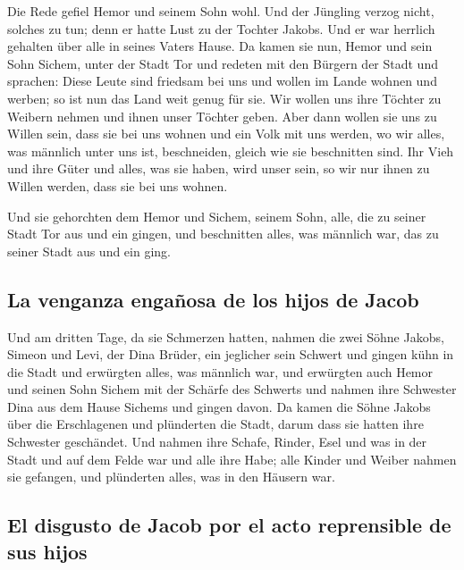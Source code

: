  Die Rede gefiel Hemor und seinem Sohn wohl.
 Und der Jüngling verzog nicht, solches zu tun; denn er
hatte Lust zu der Tochter Jakobs. Und er war herrlich gehalten über alle
in seines Vaters Hause.  Da kamen sie nun, Hemor und sein
Sohn Sichem, unter der Stadt Tor und redeten mit den Bürgern der Stadt
und sprachen:  Diese Leute sind friedsam bei uns und
wollen im Lande wohnen und werben; so ist nun das Land weit genug für
sie. Wir wollen uns ihre Töchter zu Weibern nehmen und ihnen unser
Töchter geben.  Aber dann wollen sie uns zu Willen sein,
dass sie bei uns wohnen und ein Volk mit uns werden, wo wir alles, was
männlich unter uns ist, beschneiden, gleich wie sie beschnitten sind.
 Ihr Vieh und ihre Güter und alles, was sie haben, wird
unser sein, so wir nur ihnen zu Willen werden, dass sie bei uns wohnen.

 Und sie gehorchten dem Hemor und Sichem, seinem Sohn,
alle, die zu seiner Stadt Tor aus und ein gingen, und beschnitten alles,
was männlich war, das zu seiner Stadt aus und ein ging.

\hypertarget{la-venganza-engauxf1osa-de-los-hijos-de-jacob}{%
\subsection{La venganza engañosa de los hijos de
Jacob}\label{la-venganza-engauxf1osa-de-los-hijos-de-jacob}}

 Und am dritten Tage, da sie Schmerzen hatten, nahmen die
zwei Söhne Jakobs, Simeon und Levi, der Dina Brüder, ein jeglicher sein
Schwert und gingen kühn in die Stadt und erwürgten alles, was männlich
war,  und erwürgten auch Hemor und seinen Sohn Sichem mit
der Schärfe des Schwerts und nahmen ihre Schwester Dina aus dem Hause
Sichems und gingen davon.  Da kamen die Söhne Jakobs über
die Erschlagenen und plünderten die Stadt, darum dass sie hatten ihre
Schwester geschändet.  Und nahmen ihre Schafe, Rinder,
Esel und was in der Stadt und auf dem Felde war  und alle
ihre Habe; alle Kinder und Weiber nahmen sie gefangen, und plünderten
alles, was in den Häusern war.

\hypertarget{el-disgusto-de-jacob-por-el-acto-reprensible-de-sus-hijos}{%
\subsection{El disgusto de Jacob por el acto reprensible de sus
hijos}\label{el-disgusto-de-jacob-por-el-acto-reprensible-de-sus-hijos}}

